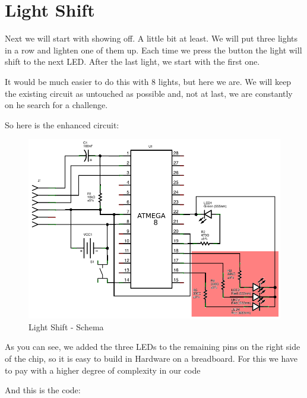 \section{Light Shift}

Next we will start with showing off. A little bit at least. We will put three lights in a row and lighten one of them up. Each time we press the button the light will shift to the next LED. After the last light, we start with the first one.

It would be much easier to do this with 8 lights, but here we are. We will keep the existing circuit as untouched as possible and, not at last, we are constantly on he search for a challenge.

So here is the enhanced circuit:

\begin{figure}[htbp]
  \centering
  \includegraphics[width=120mm]{LED/S010_light-shift_Circuit_schema.png}
  \caption{Light Shift - Schema}
  \label{atmega8-light-shift-schema}
\end{figure}

As you can see, we added the three LEDs to the remaining pins on the right side of the chip, so it is easy to build in Hardware on a breadboard. For this we have to pay with a higher degree of complexity in our code

And this is the code:

